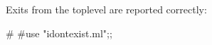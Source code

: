 Exits from the toplevel are reported correctly:

\begin{ocaml}
# #use "idontexist.ml";;
\end{ocaml}
